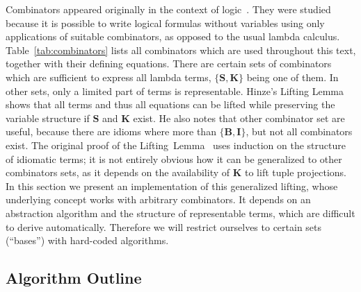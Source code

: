 Combinators appeared originally in the context of logic~\cite{curry68}.
They were studied because it is possible to write logical formulas without
variables using only applications of suitable combinators, as opposed to the
usual lambda calculus.
Table~\ref{tab:combinators} lists all combinators which are used throughout
this text, together with their defining equations.
There are certain sets of combinators which are sufficient to express all
lambda terms, $\{\mathbf{S,K}\}$ being one of them.
In other sets, only a limited part of terms is representable.
Hinze's Lifting Lemma shows that all terms and thus all equations can be
lifted while preserving the variable structure if $\mathbf{S}$ and $\mathbf{K}$
exist.
He also notes that other combinator set are useful, because there are idioms
where more than $\{\mathbf{B,I}\}$, but not all combinators exist.
The original proof of the Lifting~Lemma~\cite[11--14]{hinze10} uses induction
on the structure of idiomatic terms; it is not entirely obvious how it can
be generalized to other combinators sets, as it depends on the availability
of $\mathbf{K}$ to lift tuple projections.
In this section we present an implementation of this generalized lifting,
whose underlying concept works with arbitrary combinators.
It depends on an abstraction algorithm and the structure of representable terms,
which are difficult to derive automatically.
Therefore we will restrict ourselves to certain sets (``bases'') with
hard-coded algorithms.

\subsection{Algorithm Outline}\label{subsec:general-algorithm}

